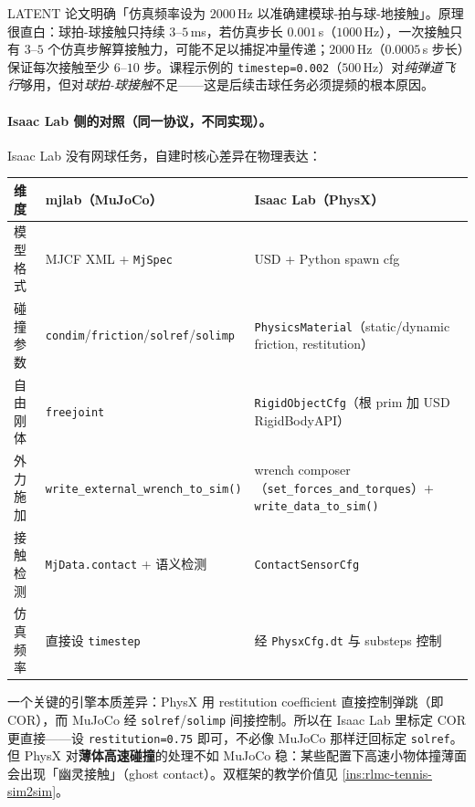LATENT 论文明确「仿真频率设为 $2000$\,Hz 以准确建模球-拍与球-地接触」\cite{tennis_latent2026}。原理很直白：球拍-球接触只持续 $3$--$5$\,ms，若仿真步长 $0.001$\,s（$1000$\,Hz），一次接触只有 $3$--$5$ 个仿真步解算接触力，可能不足以捕捉冲量传递；$2000$\,Hz（$0.0005$\,s 步长）保证每次接触至少 $6$--$10$ 步。课程示例的 \verb|timestep=0.002|（$500$\,Hz）对\emph{纯弹道飞行}够用，但对\emph{球拍-球接触}不足——这是后续击球任务必须提频的根本原因。

\paragraph{Isaac Lab 侧的对照（同一协议，不同实现）。}Isaac Lab 没有网球任务，自建时核心差异在物理表达：

\begin{center}
\small
\begin{tabular}{@{}lll@{}}
\toprule
维度 & mjlab（MuJoCo） & Isaac Lab（PhysX） \\
\midrule
模型格式 & MJCF XML + \verb|MjSpec| & USD + Python spawn cfg \\
碰撞参数 & \verb|condim|/\verb|friction|/\verb|solref|/\verb|solimp| & \verb|PhysicsMaterial|（static/dynamic friction, restitution） \\
自由刚体 & \verb|freejoint| & \verb|RigidObjectCfg|（根 prim 加 USD RigidBodyAPI） \\
外力施加 & \verb|write_external_wrench_to_sim()| & wrench composer（\verb|set_forces_and_torques|）$+$\verb|write_data_to_sim()| \\
接触检测 & \verb|MjData.contact| + 语义检测 & \verb|ContactSensorCfg| \\
仿真频率 & 直接设 \verb|timestep| & 经 \verb|PhysxCfg.dt| 与 substeps 控制 \\
\bottomrule
\end{tabular}
\end{center}

一个关键的引擎本质差异：PhysX 用 restitution coefficient 直接控制弹跳（即 COR），而 MuJoCo 经 \verb|solref|/\verb|solimp| 间接控制。所以在 Isaac Lab 里标定 COR 更直接——设 \verb|restitution=0.75| 即可，不必像 MuJoCo 那样迂回标定 \verb|solref|。但 PhysX 对\textbf{薄体高速碰撞}的处理不如 MuJoCo 稳：某些配置下高速小物体撞薄面会出现「幽灵接触」（ghost contact）。双框架的教学价值见 \cref{ins:rlmc-tennis-sim2sim}。

